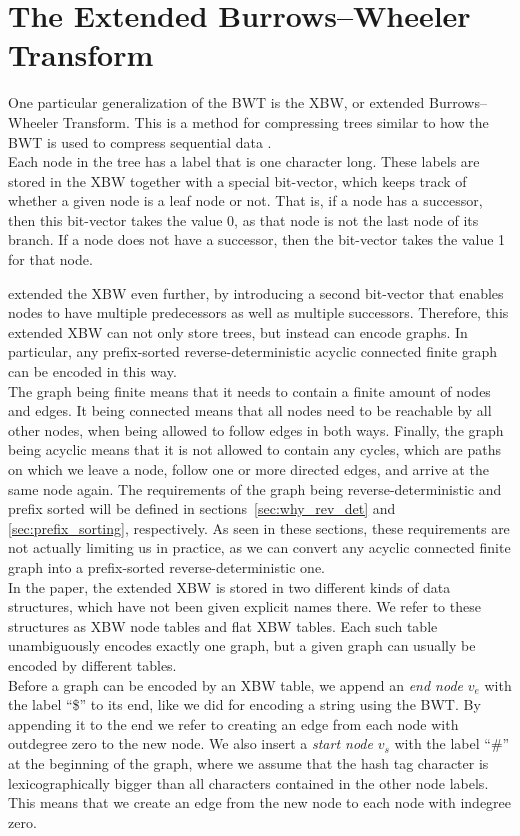 \documentclass[a4paper,12pt,twoside,BCOR=10mm]{scrbook}
\begin{document}
\section{The Extended Burrows--Wheeler Transform}

One particular generalization of the BWT is the XBW, or extended Burrows--Wheeler Transform.
This is a method for compressing trees similar to how the
BWT is used to compress sequential data \citep{Ferragina2009}. \\
Each node in the tree has a label that is one character long.
These labels are stored in the XBW together with a special bit-vector,
which keeps track of whether a given node is a leaf node or not.
That is, if a node has a successor, then this bit-vector takes the value 0, as that node is not the last node
of its branch. If a node does not have a successor, then the bit-vector takes the value 1 for that node.

\citet{Siren2014} extended the XBW even further, by introducing a second bit-vector that enables nodes
to have multiple predecessors as well as multiple successors. Therefore, this extended XBW can not only
store trees, but instead can encode graphs.
In particular, any prefix-sorted reverse-deterministic
acyclic connected finite graph can be encoded in this way. \\
The graph being finite means that
it needs to contain a finite amount of nodes and edges. It being connected means that all
nodes need to be reachable by all other nodes, when being allowed to follow edges in both ways.
Finally, the graph being acyclic means that it is
not allowed to contain any cycles, which are paths on which we leave a node, follow one
or more directed edges, and arrive at the same node again.
The requirements of the graph being reverse-deterministic and prefix sorted
will be defined in sections~\ref{sec:why_rev_det} and \ref{sec:prefix_sorting}, respectively.
As seen in these sections,
these requirements are not actually limiting us in practice,
as we can convert any acyclic connected finite graph
into a prefix-sorted reverse-deterministic one. \\
In the paper, the extended XBW is stored in two different kinds of data structures,
which have not been given explicit names there. We refer to these structures as
XBW node tables and flat XBW tables.
Each such table unambiguously encodes exactly one graph, but a given graph
can usually be encoded by different tables. \\
Before a graph can be encoded by an XBW table, we append an \textit{end node} $ v_e $ with the label “\$”
to its end,
like we did for encoding a string using the BWT.
By appending it to the end we refer to creating an edge from each node with outdegree zero to the new node.
We also insert a \textit{start node} $ v_s $ with the label “$\#$” at the beginning of the graph,
where we assume that the hash tag character is lexicographically bigger
than all characters contained in the other node labels.
This means that we create an edge from the new node to each node with indegree zero.
\end{document}
